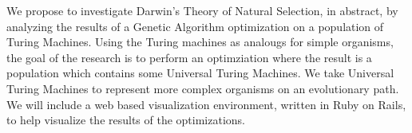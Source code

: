 We propose to investigate Darwin's Theory of Natural Selection, in abstract, by analyzing the results of a Genetic Algorithm optimization on a population of Turing Machines. Using the Turing machines as analougs for simple organisms, the goal of the research is to perform an optimziation where the result is a population which contains some Universal Turing Machines. We take Universal Turing Machines to represent more complex organisms on an evolutionary path. We will include a web based visualization environment, written in Ruby on Rails, to help visualize the results of the optimizations. 